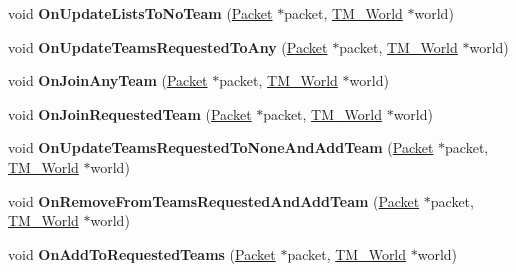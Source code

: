 \begin{DoxyCompactItemize}
\item 
\hypertarget{class_rak_net_1_1_team_manager_a031dcfe238a7659457dc91c07ffd4e30}{void {\bfseries On\-Update\-Lists\-To\-No\-Team} (\hyperlink{struct_rak_net_1_1_packet}{Packet} $\ast$packet, \hyperlink{class_rak_net_1_1_t_m___world}{T\-M\-\_\-\-World} $\ast$world)}\label{class_rak_net_1_1_team_manager_a031dcfe238a7659457dc91c07ffd4e30}

\item 
\hypertarget{class_rak_net_1_1_team_manager_ab2ceae20be9e8e94d656cf64b8a906d0}{void {\bfseries On\-Update\-Teams\-Requested\-To\-Any} (\hyperlink{struct_rak_net_1_1_packet}{Packet} $\ast$packet, \hyperlink{class_rak_net_1_1_t_m___world}{T\-M\-\_\-\-World} $\ast$world)}\label{class_rak_net_1_1_team_manager_ab2ceae20be9e8e94d656cf64b8a906d0}

\item 
\hypertarget{class_rak_net_1_1_team_manager_a42eec5df3ebbdd4fdfe30a6ec4c61889}{void {\bfseries On\-Join\-Any\-Team} (\hyperlink{struct_rak_net_1_1_packet}{Packet} $\ast$packet, \hyperlink{class_rak_net_1_1_t_m___world}{T\-M\-\_\-\-World} $\ast$world)}\label{class_rak_net_1_1_team_manager_a42eec5df3ebbdd4fdfe30a6ec4c61889}

\item 
\hypertarget{class_rak_net_1_1_team_manager_a1063da9fd458d8c65248e2d715da24ba}{void {\bfseries On\-Join\-Requested\-Team} (\hyperlink{struct_rak_net_1_1_packet}{Packet} $\ast$packet, \hyperlink{class_rak_net_1_1_t_m___world}{T\-M\-\_\-\-World} $\ast$world)}\label{class_rak_net_1_1_team_manager_a1063da9fd458d8c65248e2d715da24ba}

\item 
\hypertarget{class_rak_net_1_1_team_manager_a745a4dd480b2f7b8b44fde0ab3cf8e5a}{void {\bfseries On\-Update\-Teams\-Requested\-To\-None\-And\-Add\-Team} (\hyperlink{struct_rak_net_1_1_packet}{Packet} $\ast$packet, \hyperlink{class_rak_net_1_1_t_m___world}{T\-M\-\_\-\-World} $\ast$world)}\label{class_rak_net_1_1_team_manager_a745a4dd480b2f7b8b44fde0ab3cf8e5a}

\item 
\hypertarget{class_rak_net_1_1_team_manager_aaaa82622233e4366418ec290f2a6a36b}{void {\bfseries On\-Remove\-From\-Teams\-Requested\-And\-Add\-Team} (\hyperlink{struct_rak_net_1_1_packet}{Packet} $\ast$packet, \hyperlink{class_rak_net_1_1_t_m___world}{T\-M\-\_\-\-World} $\ast$world)}\label{class_rak_net_1_1_team_manager_aaaa82622233e4366418ec290f2a6a36b}

\item 
\hypertarget{class_rak_net_1_1_team_manager_aed291cbcc6a9183b3fd1e8a1822ae551}{void {\bfseries On\-Add\-To\-Requested\-Teams} (\hyperlink{struct_rak_net_1_1_packet}{Packet} $\ast$packet, \hyperlink{class_rak_net_1_1_t_m___world}{T\-M\-\_\-\-World} $\ast$world)}\label{class_rak_net_1_1_team_manager_aed291cbcc6a9183b3fd1e8a1822ae551}


\end{DoxyCompactItemize}
